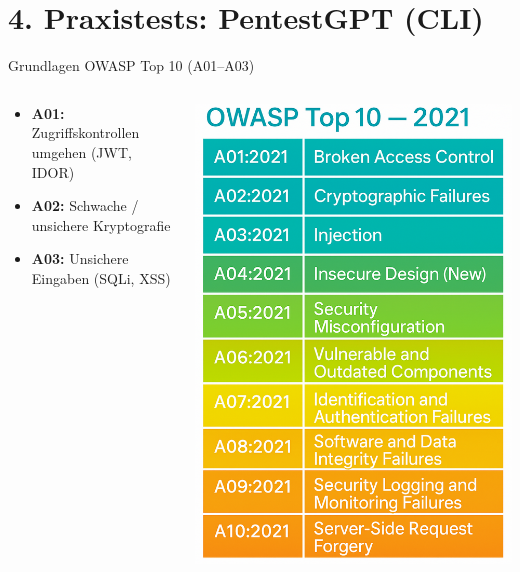 \documentclass[
	aspectratio=169,	%
	onlytextwidth,		%
	t,					%
	]{beamer}
\begin{document}
\section{4. Praxistests: PentestGPT (CLI)}

\begin{frame}{Grundlagen OWASP Top 10 (A01–A03)}
	\begin{columns}
		\begin{column}[T]{.65\textwidth}
			\begin{itemize}
				\item \textbf{A01:} Zugriffskontrollen umgehen  
				(JWT, IDOR)
				\item \textbf{A02:} Schwache / unsichere Kryptografie
				\item \textbf{A03:} Unsichere Eingaben  
				(SQLi, XSS)
			\end{itemize}		
		\end{column}
		\begin{column}[T]{.3\textwidth}
			\vspace*{-4mm}
			\centering
			\includegraphics[width=\textwidth]{figures/4.png}
			\label{fig:4}
		\end{column}
	\end{columns}
\end{frame}
\end{document}
